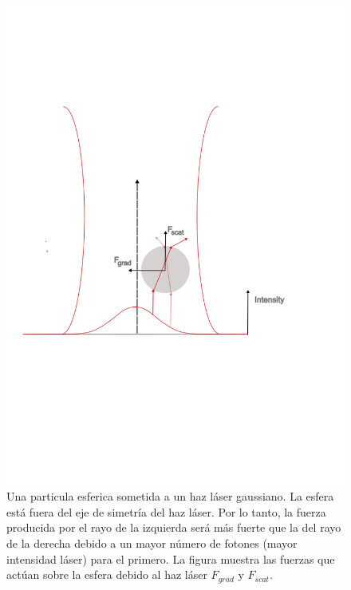 \documentclass[10pt,aspectratio=1610,compress,dvipsnames]{beamer}
\begin{document}
\begin{frame}
{\begin{figure}
    \centering
    \includegraphics[trim={0cm 7.5cm 2cm 6cm },scale=0.37]{Imagenes teoria/Optical tweezer diagrams/finallyopticaltweezer.png}
    \caption{Una particula esferica sometida a un haz láser gaussiano. La esfera está fuera del eje de simetría del haz láser. Por lo tanto, la fuerza producida por el rayo de la izquierda será más fuerte que la del rayo de la derecha debido a un mayor número de fotones (mayor intensidad láser) para el primero. La figura muestra las fuerzas que actúan sobre la esfera debido al haz láser $F_{grad}$ y $F_{scat}$. }
    \label{Microscope inverted}
\end{figure}




}
\end{frame}
\end{document}

